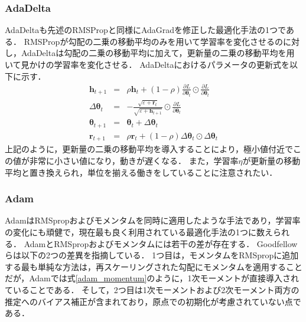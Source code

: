     \subsubsection{AdaDelta}
    AdaDelta\cite{zeiler2012adadelta}も先述のRMSPropと同様にAdaGradを修正した最適化手法の1つである．
    RMSPropが勾配の二乗の移動平均のみを用いて学習率を変化させるのに対し，AdaDeltaは勾配の二乗の移動平均に加えて，更新量の二乗の移動平均を用いて見かけの学習率を変化させる．
    AdaDeltaにおけるパラメータの更新式を以下に示す．
    \begin{eqnarray}
        \boldsymbol{h}_{t+1}&=&\rho \boldsymbol{h}_{t}+(1-\rho) \frac{\partial L}{\partial \boldsymbol{\theta}_{t}} \odot \frac{\partial L}{\partial \boldsymbol{\theta}_{t}} \\
        \Delta \boldsymbol{\theta}_{t}&=&-\frac{\sqrt{\varepsilon+\boldsymbol{r}_{t}}}{\sqrt{\varepsilon+\boldsymbol{h}_{t+1}}} \odot \frac{\partial L}{\partial \boldsymbol{\theta}_{t}} \\
        \boldsymbol{\theta}_{t+1}&=&\boldsymbol{\theta}_{t}+\Delta \boldsymbol{\theta}_{t} \\
        \boldsymbol{r}_{t+1}&=&\rho \boldsymbol{r}_{t}+(1-\rho) \Delta \boldsymbol{\theta}_{t} \odot \Delta \boldsymbol{\theta}_{t}
    \end{eqnarray}
    上記のように，更新量の二乗の移動平均を導入することにより，極小値付近でこの値が非常に小さい値になり，動きが遅くなる．
    また，学習率$\eta$が更新量の移動平均と置き換えられ，単位を揃える働きをしていることに注意されたい．
    
    \subsubsection{Adam}
    Adam\cite{kingma2014adam}はRMSpropおよびモメンタムを同時に適用したような手法であり，学習率の変化にも頑健で，現在最も良く利用されている最適化手法の1つに数えられる．
    AdamとRMSpropおよびモメンタムには若干の差が存在する．
    Goodfellowら\cite{Goodfellow-et-al-2016}は以下の2つの差異を指摘している．
    1つ目は，モメンタムをRMSpropに追加する最も単純な方法は，再スケーリングされた勾配にモメンタムを適用することだが，Adamでは式\ref{adam_momentum}のように，1次モーメントが直接導入されていることである．
    そして，2つ目は1次モーメントおよび2次モーメント両方の推定へのバイアス補正が含まれており，原点での初期化が考慮されていない点である．
    
